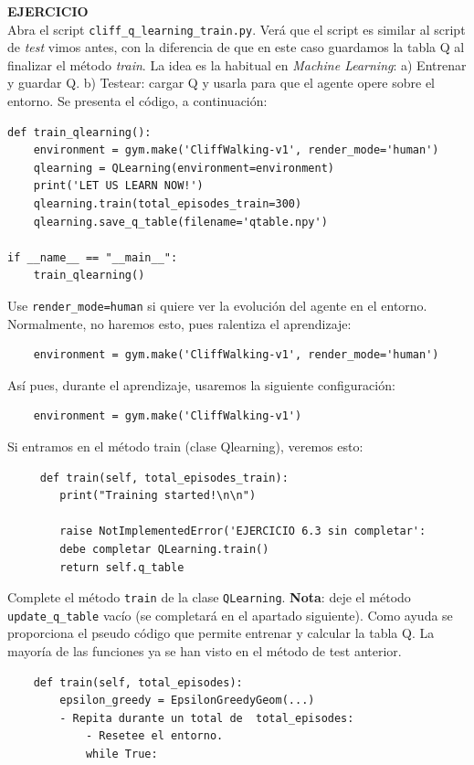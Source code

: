 \documentclass{article}
\begin{document}
\begin{exercise}
\textbf{EJERCICIO}\\
Abra el script \texttt{cliff\_q\_learning\_train.py}. Verá que el script es similar al script de \textit{test} vimos antes, con la diferencia de que en este caso guardamos la tabla Q al finalizar el método \emph{train}. La idea es la habitual en \textit{Machine Learning}: a) Entrenar y guardar Q. b) Testear: cargar Q y usarla para que el agente opere sobre el entorno. Se presenta el código, a continuación:
\begin{small}
\begin{verbatim}
def train_qlearning():    
    environment = gym.make('CliffWalking-v1', render_mode='human')
    qlearning = QLearning(environment=environment)
    print('LET US LEARN NOW!')
    qlearning.train(total_episodes_train=300)    
    qlearning.save_q_table(filename='qtable.npy')

if __name__ == "__main__":
    train_qlearning()    
\end{verbatim}
\end{small}

Use \texttt{render\_mode=human} si quiere ver la evolución del agente en el entorno. Normalmente, no haremos esto, pues ralentiza el aprendizaje:
\begin{verbatim}
    environment = gym.make('CliffWalking-v1', render_mode='human')
\end{verbatim}
Así pues, durante el aprendizaje, usaremos la siguiente configuración:
\begin{verbatim}    
    environment = gym.make('CliffWalking-v1')
\end{verbatim}
    





Si entramos en el método train (clase Qlearning), veremos esto:
\begin{small}
\begin{verbatim}
     def train(self, total_episodes_train):
        print("Training started!\n\n")

        raise NotImplementedError('EJERCICIO 6.3 sin completar': 
        debe completar QLearning.train()
        return self.q_table  
\end{verbatim}
\end{small}
    Complete el método \texttt{train} de la clase \texttt{QLearning}. \textbf{Nota}: deje el método \texttt{update\_q\_table} vacío (se completará en el apartado siguiente). Como ayuda se proporciona el pseudo código que permite entrenar y calcular la tabla Q. La mayoría de las funciones ya se han visto en el método de test anterior.
\begin{small}
\begin{verbatim}
    def train(self, total_episodes):
        epsilon_greedy = EpsilonGreedyGeom(...)
        - Repita durante un total de  total_episodes:
            - Resetee el entorno.
            while True: 
                

\end{verbatim}
\end{small}
\end{exercise}
\end{document}
